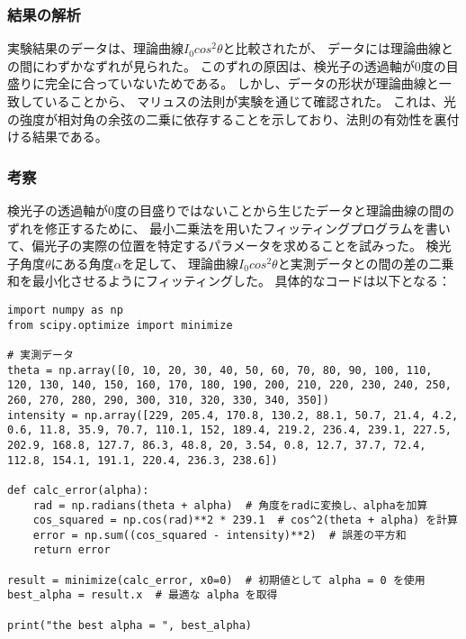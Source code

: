 \documentclass{article}
\begin{document}
\subsubsection*{結果の解析}
\begin{spacing}{1.2}
    実験結果のデータは、理論曲線$I_0cos^2\theta$と比較されたが、
    データには理論曲線との間にわずかなずれが見られた。
    このずれの原因は、検光子の透過軸が0度の目盛りに完全に合っていないためである。
    しかし、データの形状が理論曲線と一致していることから、
    マリュスの法則が実験を通じて確認された。
    これは、光の強度が相対角の余弦の二乗に依存することを示しており、法則の有効性を裏付ける結果である。
\end{spacing}

\subsubsection{考察}
\begin{spacing}{1.2}
    検光子の透過軸が0度の目盛りではないことから生じたデータと理論曲線の間のずれを修正するために、
    最小二乗法を用いたフィッティングプログラムを書いて、偏光子の実際の位置を特定するパラメータを求めることを試みった。
    検光子角度$\theta$にある角度$\alpha$を足して、
    理論曲線$I_0cos^2\theta$と実測データとの間の差の二乗和を最小化させるようにフィッティングした。
    具体的なコードは以下となる：
\end{spacing}

\begin{lstlisting} 
import numpy as np
from scipy.optimize import minimize

# 実測データ
theta = np.array([0, 10, 20, 30, 40, 50, 60, 70, 80, 90, 100, 110, 120, 130, 140, 150, 160, 170, 180, 190, 200, 210, 220, 230, 240, 250, 260, 270, 280, 290, 300, 310, 320, 330, 340, 350])
intensity = np.array([229, 205.4, 170.8, 130.2, 88.1, 50.7, 21.4, 4.2, 0.6, 11.8, 35.9, 70.7, 110.1, 152, 189.4, 219.2, 236.4, 239.1, 227.5, 202.9, 168.8, 127.7, 86.3, 48.8, 20, 3.54, 0.8, 12.7, 37.7, 72.4, 112.8, 154.1, 191.1, 220.4, 236.3, 238.6])

def calc_error(alpha):
    rad = np.radians(theta + alpha)  # 角度をradに変換し、alphaを加算
    cos_squared = np.cos(rad)**2 * 239.1  # cos^2(theta + alpha) を計算
    error = np.sum((cos_squared - intensity)**2)  # 誤差の平方和
    return error

result = minimize(calc_error, x0=0)  # 初期値として alpha = 0 を使用
best_alpha = result.x  # 最適な alpha を取得

print("the best alpha = ", best_alpha)
\end{lstlisting}
\end{document}

